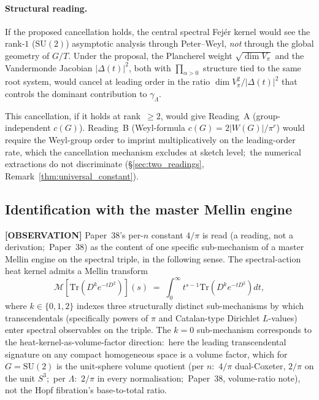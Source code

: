 \documentclass[11pt,a4paper]{article}
\theoremstyle{plain}
\theoremstyle{definition}
\newcommand{\Lammax}{\Lambda}
\newcommand{\SU}{\mathrm{SU}}
\newcommand{\Tr}{\mathrm{Tr}}
\newcommand{\Dop}{D}
\begin{document}
\paragraph{Structural reading.} If the proposed cancellation holds,
the central spectral Fej\'er kernel would see the rank-$1$ ($\SU(2)$)
asymptotic analysis through Peter--Weyl, \emph{not} through the
global geometry of $G/T$.
Under the proposal, the Plancherel weight $\sqrt{\dim V_\pi}$ and the
Vandermonde Jacobian $|\Delta(t)|^2$, both with $\prod_{\alpha > 0}$
structure tied to the same root system, would cancel at leading order
in the ratio $\dim V_\pi^2 / |\Delta(t)|^2$ that controls the dominant
contribution to $\gamma_\Lammax$.

This cancellation, if it holds at rank~$\ge 2$, would give Reading~A
(group-independent $c(G)$). Reading~B (Weyl-formula
$c(G) = 2|W(G)|/\pi^r$) would require the Weyl-group order to imprint
multiplicatively on the leading-order rate, which the cancellation
mechanism excludes at sketch level;\ the numerical extractions do not
discriminate (\S\ref{sec:two_readings},
Remark~\ref{thm:universal_constant}).

\subsection{Identification with the master Mellin engine}\label{sec:master_mellin}

\textbf{[OBSERVATION]} Paper~38's per-$n$ constant $4/\pi$ is read (a
reading, not a derivation;\ Paper~38) as the content of one specific
sub-mechanism of a master Mellin engine on the spectral triple, in the
following sense. The spectral-action heat kernel admits a Mellin transform
\begin{equation}\label{eq:master_mellin}
   \mathcal M[\Tr(\Dop^k e^{-t\Dop^2})](s)
   \;=\; \int_0^\infty t^{s-1} \Tr(\Dop^k e^{-t\Dop^2}) dt,
\end{equation}
where $k \in \{0, 1, 2\}$ indexes three structurally distinct
sub-mechanisms by which transcendentals (specifically powers of $\pi$
and Catalan-type Dirichlet $L$-values) enter spectral observables on
the triple. The $k = 0$ sub-mechanism corresponds to the
heat-kernel-as-volume-factor direction:\ here the leading
transcendental signature on any compact homogeneous space is a
volume factor, which for $G = \SU(2)$ is the unit-sphere volume
quotient (per $n$:\ $4/\pi$ dual-Coxeter, $2/\pi$ on the
unit $S^3$;\ per $\Lammax$:\ $2/\pi$ in every normalisation;\ Paper~38,
volume-ratio note), not the Hopf fibration's base-to-total ratio.
\end{document}
